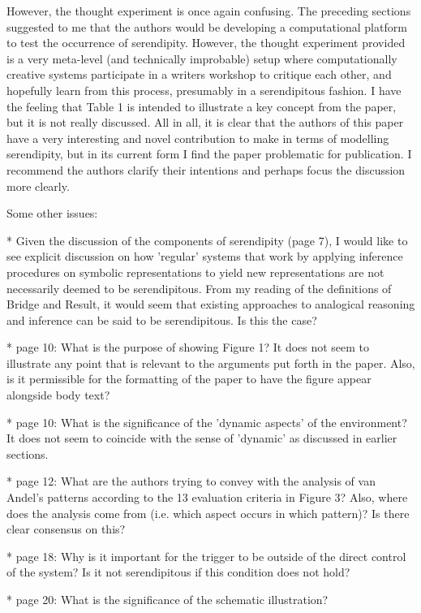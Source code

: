 However, the thought experiment is once again confusing. The preceding sections suggested to
me that the authors would be developing a computational platform to test the occurrence of
serendipity. However, the thought experiment provided is a very meta-level (and technically
improbable) setup where computationally creative systems participate in a writers workshop to
critique each other, and hopefully learn from this process, presumably in a serendipitous
fashion. I have the feeling that Table 1 is intended to illustrate a key concept from the paper, but
it is not really discussed.
All in all, it is clear that the authors of this paper have a very interesting and novel contribution to
make in terms of modelling serendipity, but in its current form I find the paper problematic for
publication. I recommend the authors clarify their intentions and perhaps focus the discussion
more clearly.

Some other issues:

* Given the discussion of the components of serendipity (page 7), I would like to see explicit
discussion on how 'regular' systems that work by applying inference procedures on symbolic
representations to yield new representations are not necessarily deemed to be serendipitous.
From my reading of the definitions of Bridge and Result, it would seem that existing approaches
to analogical reasoning and inference can be said to be serendipitous. Is this the case?

* page 10: What is the purpose of showing Figure 1? It does not seem to illustrate any point that
is relevant to the arguments put forth in the paper. Also, is it permissible for the formatting of the
paper to have the figure appear alongside body text?

* page 10: What is the significance of the 'dynamic aspects' of the environment? It does not
seem to coincide with the sense of 'dynamic' as discussed in earlier sections.

* page 12: What are the authors trying to convey with the analysis of van Andel's patterns
according to the 13 evaluation criteria in Figure 3? Also, where does the analysis come from
(i.e. which aspect occurs in which pattern)? Is there clear consensus on this?

* page 18: Why is it important for the trigger to be outside of the direct control of the system? Is
it not serendipitous if this condition does not hold?

* page 20: What is the significance of the schematic illustration?

